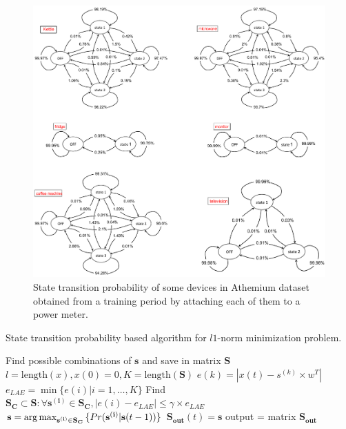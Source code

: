 \begin{figure}
\centering
\includegraphics[width=1\textwidth]{./chapters/chapter3/images/Athemium_trans_proba.pdf} 
\caption{State transition probability of some devices in Athemium dataset obtained from a training period by attaching each of them to a power meter.} 
\label{fig:L1} 
\end{figure}

\begin{algorithm}
\caption{State transition probability based algorithm for $l1$-norm minimization problem.}\label{algoL3}
\begin{algorithmic}[1]
\State Find possible combinations of $\mathbf{s}$ and save in matrix $\mathbf{S}$
\State $l = \text{length}(x),x(0) = 0,K=\text{length}(\mathbf{S})$
	        \State $e(k) = |x(t)-s^{(k)}\times w^T|$
	    \EndFor
		\State $e_{LAE} = \min{\{e(i)|i=1,\ldots,K\}}$
		\State Find $\mathbf{S_C}\subset \mathbf{S}: \forall \mathbf{s^{(i)}}\in \mathbf{S_C},|e(i)-e_{LAE}|\leq \gamma \times e_{LAE}$
		\State $\mathbf{s} = \operatorname*{arg\,max}_{\mathbf{s^{(i)}}\in \mathbf{S_C}}{\{Pr(\mathbf{s^{(i)}}|\mathbf{s}(t-1))\}}$
		\State $\mathbf{S_{out}}(t) = \mathbf{s}$
	\EndFor
\State output = matrix $\mathbf{S_{out}}$
\EndFunction
\end{algorithmic}
\end{algorithm}



